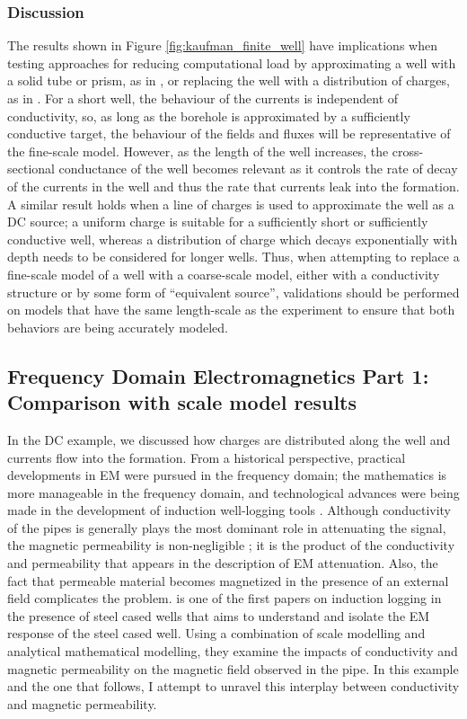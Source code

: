 \subsubsection{Discussion}

The results shown in Figure \ref{fig:kaufman_finite_well} have implications when testing approaches for reducing computational load by approximating a well with a solid tube or prism, as in \cite{Um2015}, or replacing the well with a distribution of charges, as in \cite{Weiss2016}. For a short well, the behaviour of the currents is independent of conductivity, so, as long as the borehole is approximated by a sufficiently conductive target, the behaviour of the fields and fluxes will be representative of the fine-scale model. However, as the length of the well increases, the cross-sectional conductance of the well becomes relevant as it controls the rate of decay of the currents in the well and thus the rate that currents leak into the formation. A similar result holds when a line of charges is used to approximate the well as a DC source; a uniform charge is suitable for a sufficiently short or sufficiently conductive well, whereas a distribution of charge which decays exponentially with depth needs to be considered for longer wells. Thus, when attempting to replace a fine-scale model of a well with a coarse-scale model, either with a conductivity structure or by some form of ``equivalent source'', validations should be performed on models that have the same length-scale as the experiment to ensure that both behaviors are being accurately modeled.

\subsection{Frequency Domain Electromagnetics Part 1: Comparison with scale model results}
\label{sec:FDEM_part1}

In the DC example, we discussed how charges are distributed along the well and currents flow into the formation. From a historical perspective, practical developments in EM were pursued in the frequency domain; the mathematics is more manageable in the frequency domain, and technological advances were being made in the development of induction well-logging tools \citep{Doll1949, Moran1962}. Although conductivity of the pipes is generally plays the most dominant role in attenuating the signal, the magnetic permeability is non-negligible \citep{Wait1977}; it is the product of the conductivity and permeability that appears in the description of EM attenuation. Also, the fact that permeable material becomes magnetized in the presence of an external field complicates the problem.
\cite{Augustin1989} is one of the first papers on induction logging in the presence of steel cased wells that aims to understand and isolate the EM response of the steel cased well. Using a combination of scale modelling and analytical mathematical modelling, they examine the impacts of conductivity and magnetic permeability on the magnetic field observed in the pipe. In this example and the one that follows, I attempt to unravel this interplay between conductivity and magnetic permeability.

